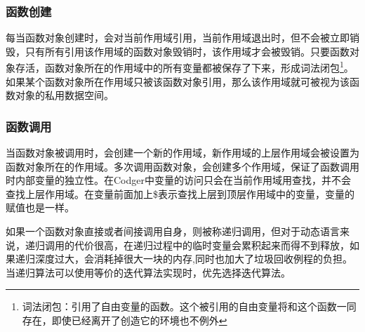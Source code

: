 \subsubsection{函数创建}
每当函数对象创建时，会对当前作用域引用，当前作用域退出时，但不会被立即销毁，只有所有引用该作用域的函数对象毁销时，该作用域才会被毁销。只要函数对象存活，函数对象所在的作用域中的所有变量都被保存了下来，形成词法闭包\footnote{词法闭包：引用了自由变量的函数。这个被引用的自由变量将和这个函数一同存在，即使已经离开了创造它的环境也不例外}。如果某个函数对象所在作用域只被该函数对象引用，那么该作用域就可被视为该函数对象的私用数据空间。
\subsubsection{函数调用}
当函数对象被调用时，会创建一个新的作用域，新作用域的上层作用域会被设置为函数对象所在的作用域。多次调用函数对象，会创建多个作用域，保证了函数调用时内部变量的独立性。在Codger中变量的访问只会在当前作用域用查找，并不会查找上层作用域。在变量前面加上\$表示查找上层到顶层作用域中的变量，变量的赋值也是一样。

如果一个函数对象直接或者间接调用自身，则被称递归调用，但对于动态语言来说，递归调用的代价很高，在递归过程中的临时变量会累积起来而得不到释放，如果递归深度过大，会消耗掉很大一块的内存,同时也加大了垃圾回收例程的负担。当递归算法可以使用等价的迭代算法实现时，优先选择迭代算法。
